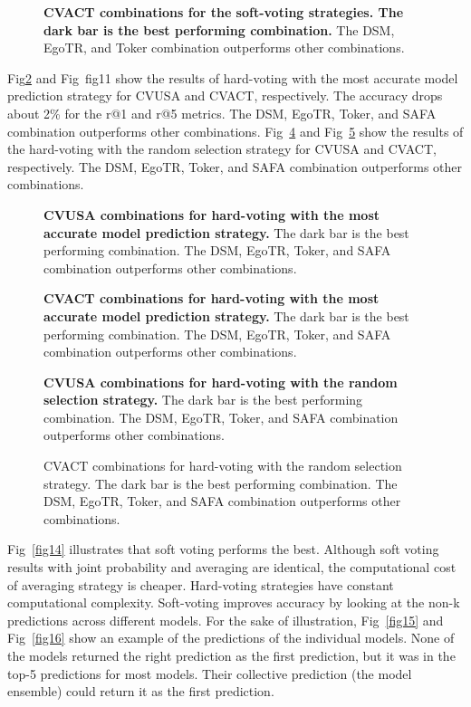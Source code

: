 \documentclass[10pt,letterpaper]{article}
\begin{document}
\begin{figure}[!h]
  \caption{{\bf CVACT combinations for the soft-voting strategies. The dark bar is the best performing combination.} The DSM, EgoTR, and Toker combination outperforms other combinations. }
  
  \label{fig9}
\end{figure}

Fig\ref{fig10} and Fig~{fig11} show the results of hard-voting with the most accurate model prediction strategy for CVUSA and CVACT, respectively. The accuracy drops about 2\% for the r@1 and r@5 metrics. The DSM, EgoTR, Toker, and SAFA combination outperforms other combinations. Fig~\ref{fig12} and Fig~\ref{fig13} show the results of the hard-voting with the random selection strategy for CVUSA and CVACT, respectively. The DSM, EgoTR, Toker, and SAFA combination outperforms other combinations.


\begin{figure}[!h]
  \caption{{\bf CVUSA combinations for hard-voting with the most accurate model prediction strategy.} The dark bar is the best performing combination. The DSM, EgoTR, Toker, and SAFA combination outperforms other combinations.}
  \label{fig10}
\end{figure}

\begin{figure}[!h]
  \caption{{\bf CVACT combinations for hard-voting with the most accurate  model prediction strategy.} The dark bar is the best performing combination. The DSM, EgoTR, Toker, and SAFA combination outperforms other combinations.}
  
  \label{fig11}
\end{figure}

\begin{figure}[!h]
  \caption{{\bf CVUSA combinations for hard-voting with the random selection strategy.} The dark bar is the best performing combination. The DSM, EgoTR, Toker, and SAFA combination outperforms other combinations. }
  \label{fig12}
\end{figure}

\begin{figure}[!h]
  \caption{{ CVACT combinations for hard-voting with the random selection strategy.}   The dark bar is the best performing combination. The DSM, EgoTR, Toker, and SAFA combination outperforms other combinations.}
  \label{fig13}
\end{figure}


Fig~\ref{fig14} illustrates that soft voting performs  the best. Although soft voting results with joint probability and averaging are identical, the computational cost of averaging strategy is cheaper. Hard-voting strategies have constant computational complexity. Soft-voting improves accuracy by looking at the non-k predictions across different models. For the sake of illustration,  Fig~\ref{fig15} and Fig~\ref{fig16} show an example of the predictions of the individual models. None of the models returned the right prediction as the first prediction, but it was in the top-5 predictions for most models. Their collective prediction (the model ensemble) could return it as the first prediction.
\end{document}
